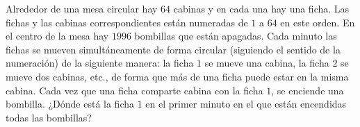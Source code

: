 Alrededor de una mesa circular hay $64$ cabinas y en cada una hay una ficha. Las fichas y las cabinas correspondientes están numeradas de $1$ a $64$ en este orden. En el centro de la mesa hay $1996$ bombillas que están apagadas. Cada minuto las fichas se mueven simultáneamente de forma circular (siguiendo el sentido de la numeración) de la siguiente manera: la ficha $1$ se mueve una cabina, la ficha $2$ se mueve dos cabinas, etc., de forma que más de una ficha puede estar en la misma cabina. Cada vez que una ficha comparte cabina con la ficha $1$, se enciende una bombilla. ¿Dónde está la ficha $1$ en el primer minuto en el que están encendidas todas las bombillas? 